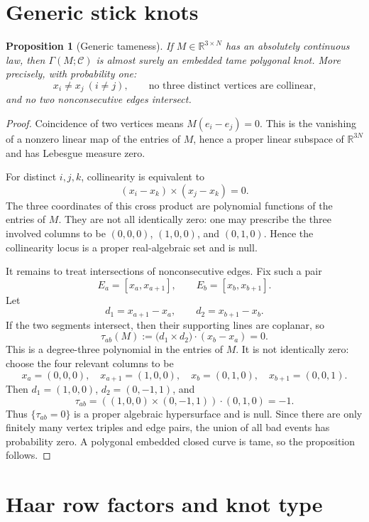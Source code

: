 \documentclass[11pt]{amsart}
\newtheorem{proposition}{Proposition}
\theoremstyle{remark}
\newcommand{\Rbb}{\mathbb{R}}
\newcommand{\1}{\mathbf{1}}
\begin{document}
\section{Generic stick knots}

\begin{proposition}[Generic tameness]\label{prop:generic-tame}
If \(M\in\Rbb^{3\times N}\) has an absolutely continuous law, then
\(\Gamma(M;\mathcal C)\) is almost surely an embedded tame polygonal knot.  More precisely,
with probability one:
\[
x_i\ne x_j\ (i\ne j),\qquad
\text{no three distinct vertices are collinear,}
\]
and no two nonconsecutive edges intersect.
\end{proposition}

\begin{proof}
Coincidence of two vertices means \(M(e_i-e_j)=0\).  This is the vanishing of a
nonzero linear map of the entries of \(M\), hence a proper linear subspace of
\(\Rbb^{3N}\) and has Lebesgue measure zero.

For distinct \(i,j,k\), collinearity is equivalent to
\[
(x_i-x_k)\times (x_j-x_k)=0.
\]
The three coordinates of this cross product are polynomial functions of the entries of
\(M\).  They are not all identically zero: one may prescribe the three involved columns to
be \((0,0,0)\), \((1,0,0)\), and \((0,1,0)\).  Hence the collinearity locus is a
proper real-algebraic set and is null.

It remains to treat intersections of nonconsecutive edges.  Fix such a pair
\[
E_a=[x_a,x_{a+1}],\qquad E_b=[x_b,x_{b+1}].
\]
Let
\[
d_1=x_{a+1}-x_a,\qquad d_2=x_{b+1}-x_b.
\]
If the two segments intersect, then their supporting lines are coplanar, so
\[
\tau_{ab}(M):=\big(d_1\times d_2\big)\cdot(x_b-x_a)=0.
\]
This is a degree-three polynomial in the entries of \(M\).  It is not identically zero:
choose the four relevant columns to be
\[
x_a=(0,0,0),\quad x_{a+1}=(1,0,0),\quad
x_b=(0,1,0),\quad x_{b+1}=(0,0,1).
\]
Then \(d_1=(1,0,0)\), \(d_2=(0,-1,1)\), and
\[
\tau_{ab}=((1,0,0)\times(0,-1,1))\cdot(0,1,0)=-1.
\]
Thus \(\{\tau_{ab}=0\}\) is a proper algebraic hypersurface and is null.  Since there are
only finitely many vertex triples and edge pairs, the union of all bad events has probability
zero.  A polygonal embedded closed curve is tame, so the proposition follows.
\end{proof}

\section{Haar row factors and knot type}
\end{document}
